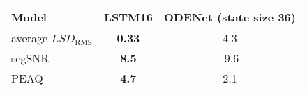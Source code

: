 \newcommand{\modelNameCellWidth}{1.8cm}
    \begin{tabular}{@{} l | c c @{}}
        \toprule
        Model & LSTM16 & ODENet (state size 36) \\ \midrule
        average $LSD_\text{RMS}$ & \textbf{0.33} & 4.3 \\
        segSNR  & \textbf{8.5} & -9.6  \\
        PEAQ     & \textbf{4.7} & 2.1 \\ \bottomrule
    \end{tabular}%
    